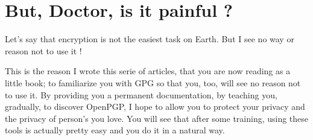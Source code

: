 \section{But, Doctor, is it painful ?}\label{but-doctor-is-it-painful}

Let's say that encryption is not the easiest task on Earth. But I see no way or reason not to use it !

This is the reason I wrote this serie of articles, that you are now reading as a little book; to familiarize you with GPG so that you, too, will see no reason not to use it. By providing you a permanent documentation, by teaching you, gradually, to discover OpenPGP, I hope to allow you to protect your privacy and the
privacy of person's you love. You will see that after some training, using these tools is actually pretty easy and you do it in a natural way.